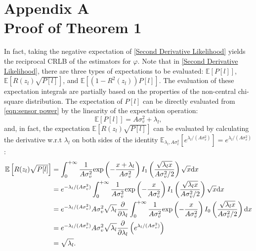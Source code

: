 \documentclass[12pt,draftclsnofoot,journal,onecolumn]{IEEEtran}
\theoremstyle{nonumberplain}
\def \exp {\text{exp}}
\begin{document}
\section*{Appendix A\\ Proof of Theorem 1}\label{appendix:proof of theorem1}
\begin{IEEEproof}
    In fact, taking the negative expectation of \eqref{Second Derivative Likelihood} yields the reciprocal CRLB of the estimators for $\hat{\varphi}$. Note that in \eqref{Second Derivative Likelihood}, there are three types of expectations to be evaluated: $\mathbb{E}\left[P[l]\right]$, $\mathbb{E}\left[R(z_l)\sqrt{P[l]}\right]$, and $\mathbb{E}\left[(1-R^2(z_l))P[l]\right]$. The evaluation of these expectation integrals are partially based on the properties of the non-central chi-square distribution. The expectation of $P[l]$ can be directly evaluated from \eqref{eqn:sensor power} by the linearity of the expectation operation:
    \begin{equation}
        \mathbb{E}\left[P[l]\right] = A\sigma_v^2 + \lambda_l,
        \label{eqn:expectation of P_l}
    \end{equation}
    and, in fact, the expectation $\mathbb{E}\left[R(z_l) \sqrt{P[l]}\right]$ can be evaluated by calculating the derivative w.r.t $\lambda_l$ on both sides of the identity $\mathbb{E}_{\lambda_l, A\sigma_v^2}[e^{\lambda_l/(A\sigma_v^2)}]=e^{\lambda_l/(A\sigma_v^2)}$:
    \begin{equation}
        \begin{aligned}
            \mathbb{E}\left[R(z_l) \sqrt{P[l]}\right] & = \int_{0}^{+\infty}{\frac{1}{A\sigma_v^2}\exp\left(-\frac{x+\lambda_l}{A\sigma_v^2}\right)I_1\left(\frac{\sqrt{\lambda_l x}}{A\sigma_v^2/2}\right)\sqrt{x}{\rm d}x}\\
            & = e^{-\lambda_l/(A\sigma_v^2)}\int_{0}^{+\infty}{\frac{1}{A\sigma_v^2}\exp\left(-\frac{x}{A\sigma_v^2}\right)I_1\left(\frac{\sqrt{\lambda_l x}}{A\sigma_v^2/2}\right)\sqrt{x}{\rm d}x} \\
            & = e^{-\lambda_l/(A\sigma_v^2)} A\sigma_v^2 \sqrt{\lambda_l} \frac{\partial}{\partial\lambda_l} \int_{0}^{+\infty}{\frac{1}{A\sigma_v^2}\exp\left(-\frac{x}{A\sigma_v^2}\right)I_0\left(\frac{\sqrt{\lambda_l x}}{A\sigma_v^2/2}\right) {\rm d}x}\\
            & = e^{-\lambda_l/(A\sigma_v^2)} A\sigma_v^2 \sqrt{\lambda_l} \frac{\partial}{\partial\lambda_l} \left(e^{\lambda_l/(A\sigma_v^2)}\right)\\
            & = \sqrt{\lambda_l}.\\

\end{aligned}
\end{equation}
\end{IEEEproof}
\end{document}
